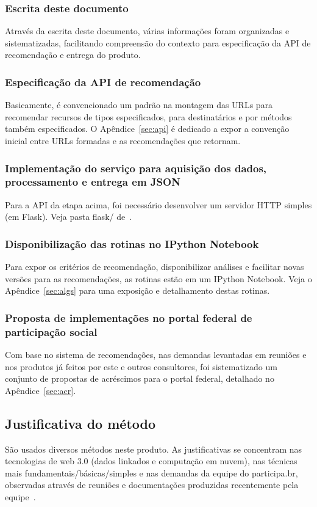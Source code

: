 \documentclass[12pt]{article}
\begin{document}
\subsubsection{Escrita deste documento}
Através da escrita deste documento, várias informações foram organizadas e sistematizadas, facilitando compreensão do contexto para especificação da API de recomendação e entrega do produto.
\subsubsection{Especificação da API de recomendação}\label{sec:api3}
Basicamente, é convencionado um padrão na montagem das URLs para recomendar recursos de tipos especificados, para destinatários e por métodos também especificados. O Apêndice~\ref{sec:api} é dedicado a expor a convenção inicial entre URLs formadas e as recomendações que retornam.
\subsubsection{Implementação do serviço para aquisição dos dados, processamento e entrega em JSON}
Para a API da etapa acima, foi necessário desenvolver um servidor HTTP simples (em Flask). Veja pasta flask/ de~\cite{repoProd4}. 
\subsubsection{Disponibilização das rotinas no IPython Notebook}\label{sec:inb5}
Para expor os critérios de recomendação, disponibilizar análises e facilitar novas versões para as recomendações, as rotinas estão em um IPython Notebook. Veja o Apêndice~\ref{sec:algs} para uma exposição e detalhamento destas rotinas.
\subsubsection{Proposta de implementações no portal federal de participação social}
Com base no sistema de recomendações, nas demandas levantadas em reuniões e nos produtos já feitos por este e outros consultores, foi sistematizado um conjunto de propostas de acréscimos para o portal federal, detalhado no Apêndice~\ref{sec:acr}.
\subsection{Justificativa do método}
São usados diversos métodos neste produto. As justificativas se concentram nas tecnologias de web 3.0 (dados linkados e computação em nuvem), nas técnicas mais fundamentais/básicas/simples e nas demandas da equipe do participa.br, observadas através de reuniões e documentações produzidas recentemente pela equipe~\cite{prodExtra}.
\end{document}
